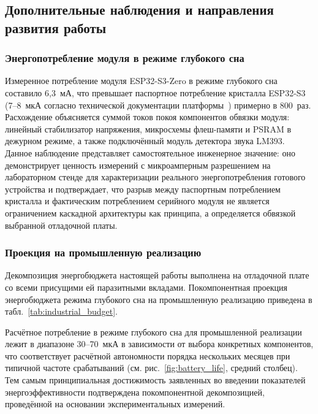 \subsection{Дополнительные наблюдения и направления развития работы}

\subsubsection{Энергопотребление модуля в режиме глубокого сна}

Измеренное потребление модуля ESP32-S3-Zero в режиме глубокого
сна составило 6,3~мА, что превышает паспортное потребление
кристалла ESP32-S3 (7--8~мкА согласно технической документации
платформы~\cite{src:9}) примерно в 800~раз. Расхождение
объясняется суммой токов покоя компонентов обвязки модуля:
линейный стабилизатор напряжения, микросхемы флеш-памяти и
PSRAM в дежурном режиме, а также подключённый модуль детектора
звука LM393. Данное наблюдение представляет самостоятельное
инженерное значение: оно демонстрирует ценность измерений с
микроамперным разрешением на лабораторном стенде для
характеризации реального энергопотребления готового устройства
и подтверждает, что разрыв между паспортным потреблением
кристалла и фактическим потреблением серийного модуля не
является ограничением каскадной архитектуры как принципа, а
определяется обвязкой выбранной отладочной платы.

\subsubsection{Проекция на промышленную реализацию}

Декомпозиция энергобюджета настоящей работы выполнена на
отладочной плате со всеми присущими ей паразитными вкладами.
Покомпонентная проекция энергобюджета режима глубокого сна на
промышленную реализацию приведена в
табл.~\ref{tab:industrial_budget}.



Расчётное потребление в режиме глубокого сна для промышленной
реализации лежит в диапазоне 30--70~мкА в зависимости от выбора
конкретных компонентов, что соответствует расчётной
автономности порядка нескольких месяцев при типичной частоте
срабатываний (см. рис.~\ref{fig:battery_life}, средний
столбец). Тем самым принципиальная достижимость заявленных во
введении показателей энергоэффективности подтверждена
покомпонентной декомпозицией, проведённой на основании
экспериментальных измерений.

